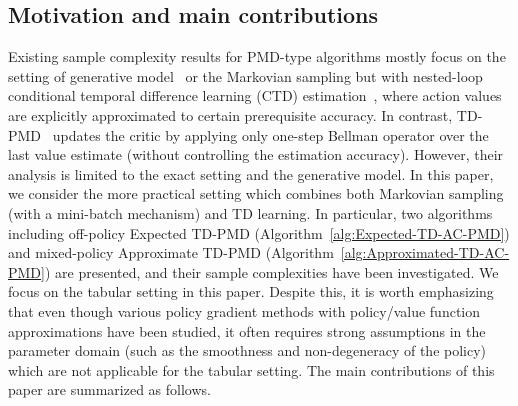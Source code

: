 \documentclass[10pt]{article}
\theoremstyle{plain}
\theoremstyle{definition}
\begin{document}
\subsection{Motivation and main contributions}
Existing sample complexity results for PMD-type algorithms mostly focus on the setting of generative model~\citep{Lan_2021,Xiao_2022,Johnson_Pike-Burke_Rebeschini_2023,protopapas2024policy} or the Markovian sampling but with nested-loop conditional temporal difference learning (CTD) estimation~\citep{Lan_2021,li2024stochastic}, {where action values are explicitly approximated to certain prerequisite accuracy. In contrast, TD-PMD~\citep{Geist_Scherrer_Pietquin_2019,liu2025tdpmd} updates the critic by applying only one-step Bellman operator over the last value estimate (without controlling the estimation accuracy). However, their analysis is limited to the exact setting and the generative model.} 
In this paper, we consider the more practical setting which combines both Markovian sampling {(with a mini-batch mechanism)} and TD learning. In particular, two algorithms including off-policy {Expected TD-PMD} (Algorithm~\ref{alg:Expected-TD-AC-PMD}) and mixed-policy {Approximate TD-PMD} (Algorithm~\ref{alg:Approximated-TD-AC-PMD}) are presented, and their sample complexities have been investigated. We focus on the tabular setting in this paper. Despite this, it is worth emphasizing that even though various policy gradient methods with policy/value function approximations  have been studied, it often requires strong assumptions in the parameter domain (such as the smoothness and non-degeneracy  of the policy) which are not applicable for the tabular setting. 
The main contributions of this paper are summarized as follows.
\end{document}

